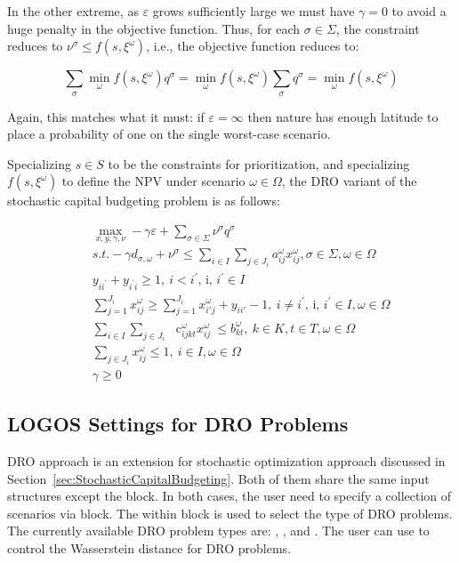 In the other extreme, as $\varepsilon$ grows sufficiently large we must have $\gamma = 0$
to avoid a huge penalty in the objective function. Thus, for each $\sigma \in \Sigma$,
the constraint reduces to $\nu^\sigma \le f(s, \xi^\omega)$, i.e.,
the objective function reduces to:

\begin{equation}
\sum_\sigma \min_\omega f(s, \xi^\omega) q^\sigma = \min_\omega f(s, \xi^\omega) \sum_\sigma q^\sigma = \min_\omega f(s, \xi^\omega)
\end{equation}

Again, this matches what it must: if $\varepsilon = \infty$ then nature has enough latitude
to place a probability of one on the single worst-case scenario.

Specializing $s\in S$ to be the constraints for prioritization, and specializing
$f(s,\xi^\omega)$ to define the NPV under scenario $\omega\in \Omega$, the DRO variant of the
stochastic capital budgeting problem is as follows:

\begin{subequations}\label{fullDRO}
\begin{eqnarray}
& & \max_{x, y, \gamma, \nu} -\gamma \varepsilon + \sum_{\sigma\in \Sigma} \nu^\sigma q^\sigma \\
& & s.t. -\gamma d_{\sigma, \omega} + \nu^\sigma \le \sum _{i \in I}^{} \sum _{j \in J_{i}}^{}a_{ij}^{ \omega }x_{ij}^{ \omega }, \sigma \in \Sigma, \omega \in \Omega \\
& & y_{ii^{'}}+y_{i^{'}i} \geq 1,~ i<i^{'}\text{, i, }i^{'} \in I \\
& & \sum_{j=1}^{J_i} x_{ij}^\omega \geq \sum_{j=1}^{J_i} x_{i'j}^\omega + y_{ii'} -1,~ i \neq i^{'}\text{, i, }i^{'} \in I,  \omega  \in  \Omega \\
& & \sum _{i \in I}^{} \sum _{j \in J_{i}}^{}\text{~ c}_{ijkt}^{ \omega }x_{ij}^{ \omega }~  \leq  b_{kt}^{ \omega },~ k \in K, t \in T,  \omega  \in  \Omega \\
& & \sum_{j\in J_i} x_{ij}^{ \omega } \leq 1,~ i \in I, \omega  \in  \Omega \\
& & \gamma \ge 0
\end{eqnarray}
\end{subequations}

\subsection{LOGOS Settings for DRO Problems}
\label{subsec:DROSettings}
DRO approach is an extension for stochastic optimization approach discussed in
Section~\ref{sec:StochasticCapitalBudgeting}. Both of them share the same input
structures except the  block. In both cases, the user need to
specify a collection of scenarios via  block. The
 within  block is used to select the
type of DRO problems. The currently available DRO problem types are:
, , and . The user can
use  to control the Wasserstein distance for DRO problems.

